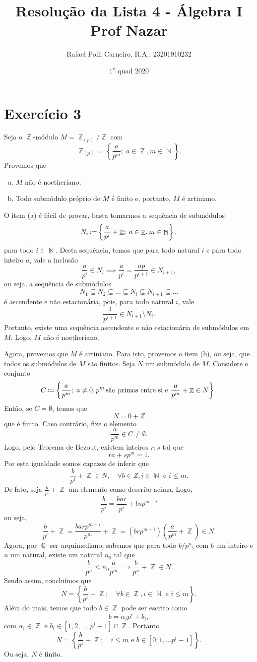 \documentclass[11pt,twoside,a4paper]{article}
\title{Resolução da Lista 4 - Álgebra I \\ Prof Nazar}
\author{Rafael Polli Carneiro, R.A.: 23201910232}
\date{$1^o$ quad $2020$}
\DeclareMathOperator{\definedAs}{\vcentcolon = }
\DeclareMathOperator {\Z}{\mathbb{Z}}
\DeclareMathOperator {\N}{\mathbb{N}}
\DeclareMathOperator {\Q}{\mathbb{Q}}
\begin{document}
\maketitle
\tableofcontents

\section{Exercício 3}
Seja o $\Z$-módulo $M = \Z_{(p)} / \Z$ com
    \[ \Z_{(p)}  = \left\{ \frac{a}{p^m}; \; a \in \Z, m \in \N \right\}. \]
Provemos que
\begin{enumerate}[(a)]
    \item $M$ não é noetheriano;
    \item Todo submódulo próprio de $M$ é finito e, portanto, $M$ é artiniano.
\end{enumerate}

O item (a) é fácil de provar, basta tomarmos a sequência de submódulos
    \[ N_i \definedAs \left\{ \frac{a}{p^i} + \Z; \; a \in \Z, m \in \N \right\}, \]
para todo $i \in \N.$ Desta sequência, temos que para todo natural $i$ e para todo inteiro $a$, vale a inclusão
    \[ \frac{a}{p^i} \in N_i \implies \frac{a}{p^i} = \frac{a p}{p^{i+1}} \in N_{i+1}, \]
ou seja, a sequência de submódulos 
\[ N_1\subseteq N_2\subseteq \ldots\subseteq N_i\subseteq N_{i+1}\subseteq \ldots\]
é ascendente e não estacionária, pois, para todo natural $i$,
vale
    \[ \frac{1}{p^{i+1}} \in N_{i+1} \setminus N_i. \]
Portanto, existe uma sequência ascendente e não estacionária de submódulos em $M$. Logo, $M$ não é noetheriano.

Agora, provemos que $M$ é artiniano. Para isto, provemos o item (b), ou seja, que todos os submódulos de $M$ são finitos.
Seja $N$ um submódulo de $M$. Considere o conjunto
    \[ C \definedAs \left\{ \frac{a}{p^m} ; \; a \neq 0, p^m \, \text{são primos entre si}  \text{ e } \frac{a}{p^m} + \Z \in N \right\}. \]
Então, se $C = \emptyset$, temos que
    \[ N = 0 + Z\]
que é finito.
Caso contrário, fixe o elemento
    \[ \frac{a}{p^m} \in C \neq \emptyset. \]
Logo, pelo Teorema de Bezout, existem inteiros $r, s$ tal que
    \[ r a + s p^m = 1.\]
Por esta igualdade somos capazes de inferir que
    \[ \frac{b}{p^i} + \Z \in N, \quad \forall b \in Z, i \in \N \text{ e } i \leq m. \]
De fato, seja $\frac{b}{p^i} + \Z$ um elemento como descrito acima. Logo,
    \[ \frac{b}{p^i} = \frac{b a r}{p^i} + b s p^{m-i} \]
ou seja,
    \[\frac{b}{p^i} + \Z =   \frac{b a r p^{m-i}}{p^m} + \Z = (brp^{m-i}) \left(\frac{a}{p^m} + \Z \right) \in N. \]
Agora, por $\Q$ ser arquimediano, sabemos que para todo $b/p^{n}$, com $b$ um inteiro e $n$ um natural, existe um natural
$n_0$ tal que
    \[ \frac{b}{p^n} \leq n_0 \frac{a}{p^m} \implies \frac{b}{p^n} + \Z \in N. \]
Sendo assim, concluímos que
    \[ N = \left\{ \frac{b}{p^i} + \Z ; \quad \forall b \in \Z, i \in \N \text{ e } i \leq m \right\}. \]
Além do mais, temos que todo $b \in \Z$ pode ser escrito como
    \[ b = \alpha_i p^i + b_i, \]
com $\alpha_i \in \Z$ e $b_i \in [1,2, \ldots, p^i -1] \cap \Z$. Portanto
    \[ N =  \left\{ \frac{b}{p^i} + \Z ; \quad i \leq m \text{ e } b \in [0, 1, \ldots p^i -1] \right\}. \]
Ou seja, $N$ é finito.
\end{document}
